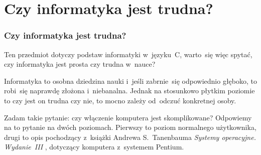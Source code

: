 \documentclass[10pt,t]{beamer}
\begin{document}








\section{Czy informatyka jest trudna?}



\begin{frame}
  \frametitle{Czy informatyka jest trudna?}


  Ten przedmiot dotyczy podstaw informatyki w~języku~C, warto~się
  więc spytać, czy informatyka jest prosta czy trudna w~nauce?

  Informatyka to osobna dziedzina nauki i~jeśli zabrnie~się odpowiednio
  głęboko, to robi~się naprawdę złożona i~niebanalna. Jednak na stosunkowo
  płytkim poziomie to czy jest on trudna czy nie, to mocno zależy od~odczuć
  konkretnej osoby.

  Zadam takie pytanie: czy włączenie komputera jest skomplikowane?
  Odpowiemy na to pytanie na dwóch poziomach. Pierwszy to poziom normalnego
  użytkownika, drugi to opis pochodzący z~książki Andrewa S.~Tanenbauma
  \textit{Systemy operacyjne. Wydanie~III}
  \parencite{Tannenbaum-Systemy-Operacyjne-Wydanie-III-Pub-2013}, dotyczący
  komputera z~systemem Pentium.

\end{frame}
\end{document}
